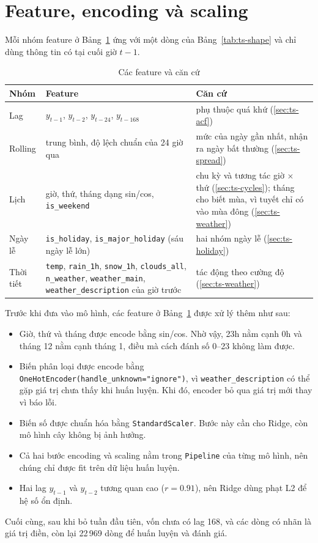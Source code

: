 \section{Feature, encoding và scaling}
\label{sec:ts-features}
Mỗi nhóm feature ở Bảng~\ref{tab:ts-features} ứng với một dòng của Bảng~\ref{tab:ts-shape} và chỉ dùng thông tin có tại cuối giờ $t-1$.

\begin{table}[H]
\centering
\caption{Các feature và căn cứ}
\label{tab:ts-features}
\small
\begin{tabular}{>{\raggedright\arraybackslash}p{1.8cm}>{\raggedright\arraybackslash}p{6.4cm}>{\raggedright\arraybackslash}p{6.0cm}}
\toprule
Nhóm & Feature & Căn cứ\\
\midrule
Lag & $y_{t-1}$, $y_{t-2}$, $y_{t-24}$, $y_{t-168}$ & phụ thuộc quá khứ (\ref{sec:ts-acf})\\
Rolling & trung bình, độ lệch chuẩn của 24 giờ qua & mức của ngày gần nhất, nhận ra ngày bất thường (\ref{sec:ts-spread})\\
Lịch & giờ, thứ, tháng dạng sin/cos, \texttt{is\_weekend} & chu kỳ và tương tác giờ $\times$ thứ (\ref{sec:ts-cycles}); tháng cho biết mùa, vì tuyết chỉ có vào mùa đông (\ref{sec:ts-weather})\\
Ngày lễ & \texttt{is\_holiday}, \texttt{is\_major\_holiday} (sáu ngày lễ lớn) & hai nhóm ngày lễ (\ref{sec:ts-holiday})\\
Thời tiết & \texttt{temp}, \texttt{rain\_1h}, \texttt{snow\_1h}, \texttt{clouds\_all}, \texttt{n\_weather}, \texttt{weather\_main}, \texttt{weather\_description} của giờ trước & tác động theo cường độ (\ref{sec:ts-weather})\\
\bottomrule
\end{tabular}
\end{table}

Trước khi đưa vào mô hình, các feature ở Bảng~\ref{tab:ts-features} được xử lý thêm như sau:
\begin{itemize}[leftmargin=1.5cm]
    \item Giờ, thứ và tháng được encode bằng sin/cos. Nhờ vậy, 23h nằm cạnh 0h và tháng 12 nằm cạnh tháng 1, điều mà cách đánh số
          0--23 không làm được.
    \item Biến phân loại được encode bằng \texttt{OneHotEncoder(handle\_unknown="ignore")}, vì \texttt{weather\_description} có thể gặp giá
          trị chưa thấy khi huấn luyện. Khi đó, encoder bỏ qua giá trị mới thay vì báo lỗi.
    \item Biến số được chuẩn hóa bằng \texttt{StandardScaler}. Bước này cần cho Ridge, còn mô hình cây không bị ảnh hưởng.
    \item Cả hai bước encoding và scaling nằm trong \texttt{Pipeline} của từng mô hình, nên chúng chỉ được fit trên dữ liệu huấn luyện.
    \item Hai lag $y_{t-1}$ và $y_{t-2}$ tương quan cao ($r = 0.91$), nên Ridge dùng phạt L2 để hệ số ổn định.
\end{itemize}
Cuối cùng, sau khi bỏ tuần đầu tiên, vốn chưa có lag 168, và các dòng có nhãn là giá trị điền, còn lại 22\,969 dòng để huấn luyện và đánh
giá.

